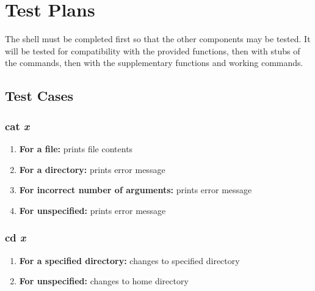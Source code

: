 \documentclass[a4paper]{article}
\begin{document}
\section{Test Plans}

The shell must be completed first so that the other components may be tested. It will be tested for compatibility with the provided functions, then with stubs of the commands, then with the supplementary functions and working commands.


\subsection{Test Cases}

\subsubsection{cat \textit{x}}
\begin{enumerate}
\item {\textbf{For a file: } prints file contents}
\item {\textbf{For a directory: } prints error message}
\item {\textbf{For incorrect number of arguments: } prints error message}
\item {\textbf{For unspecified: } prints error message}
\end{enumerate}

\subsubsection{cd \textit{x}}
\begin{enumerate}
\item {\textbf{For a specified directory: } changes to specified directory}
\item {\textbf{For unspecified: } changes to home directory}
\end{enumerate}
\end{document}
